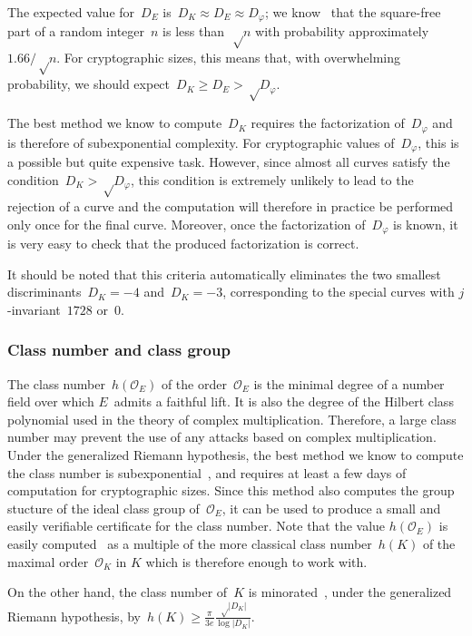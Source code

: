 \documentclass[twocolumn,letterpaper,10pt]{article}
\let\ro\mathcal
\def\abs#1{\left|#1\right|}
\def\pa#1{\left(#1\right)}
\begin{document}
The expected value for~$D_E$ is~$D_K ≈ D_E ≈ D_φ$;
we know~\cite{jis2014cdkd} that the square-free part of
a random integer~$n$ is less than~$√n$
with probability approximately~$1.66/√n$.
For cryptographic sizes, this means that,
with overwhelming probability, we should expect~$D_K \geq D_E > √{D_φ}$.

The best method we know to compute~$D_K$ requires the
factorization of~$D_φ$ and is therefore of subexponential complexity.
For cryptographic values of~$D_φ$, this is a possible but
quite expensive task.
However, since almost all curves satisfy the condition~$D_K > √{D_φ}$,
this condition is extremely unlikely to lead to the rejection of a curve
and the computation will therefore in practice be performed
only once for the final curve.
Moreover, once the factorization of~$D_φ$ is known,
it is very easy to check that the produced
factorization is correct.

It should be noted that this criteria automatically eliminates
the two smallest discriminants~$D_K = -4$ and~$D_K = -3$,
corresponding to the special curves with $j$-invariant~$1728$ or~$0$.

\subsubsection{Class number and class group}
\label{sss:class-group}

The class number~$h(\ro O_E)$ of the order~$\ro O_E$
is the minimal degree of a number field
over which $E$~admits a faithful lift.
It is also the degree of the Hilbert class polynomial
used in the theory of complex multiplication.
Therefore, a large class number may prevent the use
of any attacks based on complex multiplication.
Under the generalized Riemann hypothesis,
the best method we know to compute the class number
is subexponential~\cite{ams1989hmc,amc2010biasse},
and requires at least a few days of computation for cryptographic sizes.
Since this method also computes the group stucture
of the ideal class group of~$\ro O_E$,
it can be used to produce a small and easily verifiable certificate
for the class number.
Note that the value $h(\ro O_E)$ is easily computed~\cite[7.24]{cox1989primes}
as a multiple of the more classical class number~$h(K)$
of the maximal order~$\ro O_K$ in $K$
which is therefore enough to work with.

On the other hand,
the class number of~$K$ is minorated~\cite{cras1990louboutin},
under the generalized Riemann hypothesis,
by~$h(K) ≥ \frac{π}{3e} \frac{√{\abs{D_K}}}{\log \abs{D_K}}$.
\end{document}
